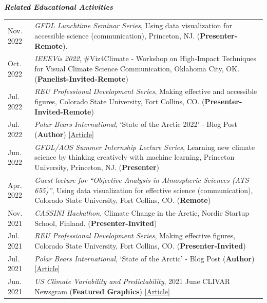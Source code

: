 \documentclass[margin,line,palatino,courier,10pt]{res}
\begin{document}
\begin{resume}
\textit{\textbf{Related Educational Activities}}
\vspace*{0.05in}\\
\begin{tabular}{@{}p{0.9in}p{4in}}
Nov. 2022 & \textit{GFDL Lunchtime Seminar Series}, Using data visualization for accessible science (communication), Princeton, NJ. (\textbf{Presenter-Remote}).\\
Oct. 2022 & \textit{IEEEVis 2022}, \#Viz4Climate - Workshop on High-Impact Techniques for Visual Climate Science Communication, Oklahoma City, OK. (\textbf{Panelist-Invited-Remote})\\
Jul. 2022 & \textit{REU Professional Development Series}, Making effective and accessible figures, Colorado State University, Fort Collins, CO. (\textbf{Presenter-Invited-Remote})\\
Jul. 2022 & \textit{Polar Bears International}, `State of the Arctic 2022' - Blog Post (\textbf{Author}) \href{https://polarbearsinternational.org/news-media/articles/arctic-sea-ice-conditions-2022}{[Article]}\\
Jun. 2022 & \textit{GFDL/AOS Summer Internship Lecture Series}, Learning new climate science by thinking creatively with machine learning, Princeton University, Princeton, NJ. (\textbf{Presenter})\\
Apr. 2022 & \textit{Guest lecture for ``Objective Analysis in Atmospheric Sciences (ATS 655)''}, Using data visualization for effective science (communication), Colorado State University, Fort Collins, CO. (\textbf{Remote})\\
Nov. 2021 & \textit{CASSINI Hackathon}, Climate Change in the Arctic, Nordic Startup School, Finland. (\textbf{Presenter-Invited})\\
Jul. 2021 & \textit{REU Professional Development Series}, Making effective figures, Colorado State University, Fort Collins, CO. (\textbf{Presenter-Invited})\\
Jul. 2021 & \textit{Polar Bears International}, `State of the Arctic' - Blog Post (\textbf{Author}) \href{https://polarbearsinternational.org/news/article-climate-change/state-of-the-arctic/}{[Article]}\\
Jun. 2021 & \textit{US Climate Variability and Predictability}, 2021 June CLIVAR Newsgram (\textbf{Featured Graphics}) \href{https://mailchi.mp/usclivar/newsgram-2021june}{[Article]}\\
\end{tabular}
\begin{tabular}{@{}p{0.9in}p{4in}}

\end{tabular}
\end{resume}
\end{document}
